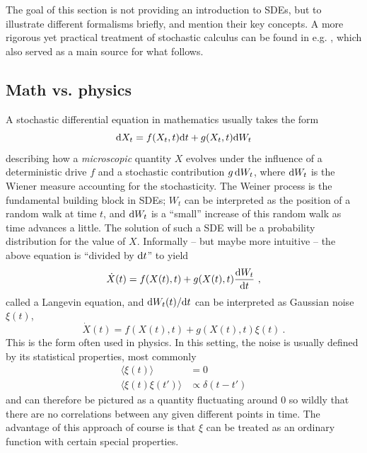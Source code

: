 The goal of this section is not providing an introduction to SDEs, but to illustrate different formalisms briefly, and mention their key concepts. A more rigorous yet practical treatment of stochastic calculus can be found in e.g. \cite{sde}, which also served as a main source for what follows.


\subsection{Math vs. physics}
\label{sec:math vs physics}

A stochastic differential equation in mathematics usually takes the form
%
\begin{equation}
	\label{eqn:sde}
	\mathrm{d} X_t = f(X_t,t) \mathrm{d} t + g(X_t,t) \mathrm{d} W_t
\end{equation}
%
describing how a \emph{microscopic} quantity \(X\) evolves under the influence of a deterministic drive \(f\) and a stochastic contribution \(g\,\mathrm{d} W_t\), where \(\mathrm{d} W_t\) is the Wiener measure accounting for the stochasticity. The Weiner process is the fundamental building block in SDEs; \(W_t\) can be interpreted as the position of a random walk at time \(t\), and \(\mathrm{d} W_t\) is a ``small'' increase of this random walk as time advances a little. The solution of such a SDE will be a probability distribution for the value of \(X\).
Informally -- but maybe more intuitive -- the above equation is ``divided by \(\mathrm{d} t\)'' to yield
%
\begin{equation}
	\dot X(t) = f(X(t),t) + g(X(t),t)\frac{\mathrm{d} W_t}{\mathrm{d} t} ~,
\end{equation}
%
called a Langevin equation, and \(\mathrm{d} W_t(t)/\mathrm{d} t\) can be interpreted as Gaussian noise \(\xi(t)\),
\begin{equation}
	\dot X(t) = f(X(t),t) + g(X(t),t)\xi(t)~.
\end{equation}
%
This is the form often used in physics. In this setting, the noise is usually defined by its statistical properties, most commonly
\begin{align}
	\langle\xi(t)\rangle &= 0 \\
	\langle\xi(t)\xi(t')\rangle &\propto \delta(t-t')
\end{align}
%
and can therefore be pictured as a quantity fluctuating around \(0\) so wildly that there are no correlations between any given different points in time. The advantage of this approach of course is that \(\xi\) can be treated as an ordinary function with certain special properties.


